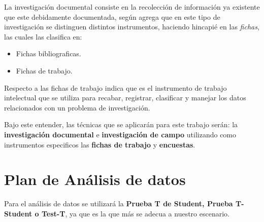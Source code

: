 La investigación documental consiste en la recolección de información ya existente
que este debidamente documentada, según \cite{robledo} agrega que en este tipo
de investigación se distinguen distintos instrumentos, haciendo hincapié en las
\emph{fichas}, las cuales \citep{robledo} las clasifica en:
\begin{itemize}
    \item Fichas bibliograficas.
    \item Fichas de trabajo.
\end{itemize}

Respecto a las fichas de trabajo \cite{robledo} indica que es el instrumento de
trabajo intelectual que se utiliza para recabar, registrar, clasificar y
manejar los datos relacionados con un problema de investigación.

Bajo este entender, las técnicas que se aplicarán para este trabajo serán:
la \textbf{investigación documental} e \textbf{investigación de campo} utilizando
como instrumentos especificos las \textbf{fichas de trabajo} y \textbf{encuestas}.


\section{Plan de Análisis de datos}
Para el análisis de datos se utilizará la \textbf{Prueba T de Student, Prueba
T-Student o Test-T}, ya que es la que más se adecua a nuestro escenario.
